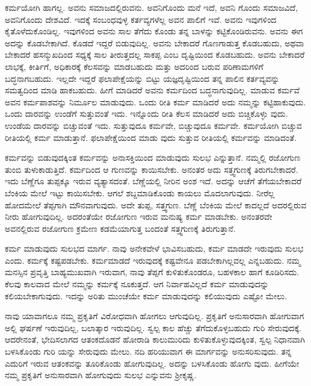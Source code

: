 ಕರ್ಮಯೋಗಿ ಹಾಗಲ್ಲ. ಅವನು ಸಮಾಜದಲ್ಲಿರುವನು. ಅವನಿಗೊಂದು ಮನೆ ಇದೆ, ಅವನಿ ಗೊಂದು ಸಮಾಜವಿದೆ, ಅವನಿಗೊಂದು ದೇಶವಿದೆ. ಇದಕ್ಕೆ ಸಂಬಂಧವುಳ್ಳ ಕರ್ತವ್ಯಗಳೆಲ್ಲ ಅವನ ಪಾಲಿಗೆ ಇವೆ. ಅವನು ಇವುಗಳಿಂದ ಕೈತೊಳೆದುಕೊಂಡಿಲ್ಲ. ಇವುಗಳಿಂದ ಅವನು ಸಾಲ ತೆಗೆದು ಕೊಂಡು ತನ್ನ ಬಾಳನ್ನು ಕಟ್ಟಿಕೊಂಡಿರುವನು. ಅವನು ಈಗ ಅದನ್ನು ಕೊಡಬೇಕಾಗಿದೆ. ಕೊಡದೆ ಇದ್ದರೆ ಬಿಡುವುದಿಲ್ಲ. ಅವನು ಬೇಕಾದರೆ ಗೊಣಗಾಡುತ್ತ ಕೊಡಬಹುದು, ಅಥವಾ ಬೇಕಾದರೆ ಹಸನ್ಮುಖದಿಂದ ಸಧ್ಯಕ್ಕೆ ಸಾಲ ತೀರುತ್ತದಲ್ಲ ಸಾಕಪ್ಪ ಎಂಬ ದೃಷ್ಟಿಯಿಂದ ಕೊಡಬಹುದು. ಅವನು ಬೇಕಾದರೆ ಲಾಭಕ್ಕೆ, ಕೀರ್ತಿಗೆ, ಅಧಿಕಾರಕ್ಕೆ ಕೆಲಸವನ್ನು ಮಾಡಬಹುದು ಮತ್ತು ಅದರಿಂದ ಬರುವ ಪರಿಣಾಮಗಳಿಗೆ ಬದ್ಧನಾಗಬಹುದು. ಇಲ್ಲದೇ ಇದ್ದರೆ ಫಲಾಪೇಕ್ಷೆಯನ್ನು ಬಿಟ್ಟು ಯಜ್ಞದೃಷ್ಟಿಯಿಂದ ತನ್ನ ಪಾಲಿನ ಕರ್ತವ್ಯವನ್ನು ಸಮತ್ವದಿಂದ ಮಾಡಿ ಹಾಕಬಹುದು. ಹೀಗೆ ಮಾಡಿದರೆ ಅವನು ಕರ್ಮದಿಂದ ಬದ್ಧನಾಗುವುದಿಲ್ಲ. ಮಾಡುವ ಕರ್ಮವೆ ಅವನ ಕರ್ಮಪಾಶವನ್ನು ನಿರ್ಮೂಲ ಮಾಡುವುದು. ಒಂದು ರೀತಿ ಕರ್ಮ ಮಾಡಿದರೆ ಅದು ನಮ್ಮನ್ನು ಕಟ್ಟಿಹಾಕುವುದು. ಒಂದು ದಾರವನ್ನು ಉಂಡೆಗೆ ಸುತ್ತುವಂತೆ ಇದು. ಇನ್ನೊಂದು ರೀತಿ ಕೆಲಸ ಮಾಡಿದರೆ ಅದು ಬಿಚ್ಚಿಕೊಳ್ಳು ವುದು. ಉಂಡೆಯ ದಾರವನ್ನು ಬಿಚ್ಚುವಂತೆ ಇದು. ಸುತ್ತುವುದೂ ಕರ್ಮವೇ, ಬಿಚ್ಚುವುದೂ ಕರ್ಮವೇ. ಕರ್ಮಯೋಗಿ ಬಿಚ್ಚುವ ರೀತಿಯಲ್ಲಿ ಕರ್ಮ ಮಾಡುತ್ತಾನೆ. ಫಲಾಪೇಕ್ಷೆಯಿಂದ ಮಾಡು ವುದು ಸುತ್ತುವ ರೀತಿಯಲ್ಲಿ ಕರ್ಮವನ್ನು ಮಾಡಿದಂತೆ.

ಕರ್ಮವನ್ನು ಬಿಡುವುದಕ್ಕಿಂತ ಕರ್ಮವನ್ನು ಅನಾಸಕ್ತಿಯಿಂದ ಮಾಡುವುದು ಸುಲಭ ಎನ್ನುತ್ತಾನೆ. ನಮ್ಮಲ್ಲಿ ರಜೋಗುಣ ತುಂಬಿ ತುಳುಕಾಡುತ್ತಿದೆ. ಕರ್ಮದಿಂದ ಆ ಗುಣವನ್ನು ಕಾಯಿಸಬೇಕು. ಅನಂತರ ಅದು ಸತ್ತ್ವಗುಣಕ್ಕೆ ತಿರುಗಬೇಕಾದರೆ. ಇದು ಬೆಣ್ಣೆಗೂ ತುಪ್ಪಕ್ಕೂ ಇರುವ ವ್ಯತ್ಯಾಸದಂತೆ. ಬೆಣ್ಣೆಯಲ್ಲಿ ನೀರಿನ ಅಂಶ ಇದೆ. ಅದನ್ನು ಆಚೆಗೆ ತೆಗೆಯಬೇಕಾದರೆ ಬೆಂಕಿಯ ಮೇಲೆ ಇಟ್ಟು ಕಾಯಿಸಬೇಕು. ಆಗಲೆ ಶಬ್ದಮಾಡಿಕೊಂಡು ಕಾಯಲು ಮೊದಲಾಗುವುದು. ನೀರೆಲ್ಲ ಹೋದಮೇಲೆ ತೆಪ್ಪಗಾಗಿ ಮೌನವಾಗುವುದು. ಅದೇ ತುಪ್ಪ, ಸತ್ತ್ವಗುಣ. ಬೆಣ್ಣೆ ಬೆಂಕಿಯ ಮೇಲೆ ಕಾದಲ್ಲದೆ ಅದರಲ್ಲಿರುವ ನೀರು ಹೋಗುವುದಿಲ್ಲ. ಅದರಂತೆಯೇ ರಜೋಗುಣ ಇರುವ ಮನುಷ್ಯ ಕರ್ಮ ಮಾಡಬೇಕು. ಅನಂತರವೇ ಅವನಲ್ಲಿರುವ ರಜೋಗುಣ ಕ್ರಮೇಣ ಕಡಮೆಯಾಗುತ್ತ ಬಂದಂತೆ ಸತ್ತ್ವಗುಣಕ್ಕೆ ತಿರುಗುತ್ತಾನೆ.

ಕರ್ಮ ಮಾಡುವುದು ಸುಲಭದ ಮಾರ್ಗ. ನಾವು ಅನೇಕವೇಳೆ ಭಾವಿಸಬಹುದು, ಕರ್ಮ ಮಾಡದೇ ಇರುವುದು ಸುಲಭ ಎಂದು. ಕರ್ಮಕ್ಕೆ ಕಷ್ಟಪಡಬೇಕು. ಕರ್ಮಮಾಡದೆ ಇರುವುದಕ್ಕೆ ಕಷ್ಟವೇನೂ ಪಡಬೇಕಾಗಿಲ್ಲವಲ್ಲ ಎನ್ನಬಹುದು. ನಮ್ಮ ಮನಸ್ಸಿನ ಪ್ರವೃತ್ತಿ ಬಾಹ್ಯಮುಖವಾಗಿ ಇರುವಾಗ, ನಾವು ತೆಪ್ಪಗೆ ಕುಳಿತುಕೊಂಡರೂ, ಬಹಳಕಾಲ ಹಾಗೆ ಕೂಡಿರಿಸದು. ಕೆಲವು ಕಾಲವಾದ ಮೇಲೆ ನಮ್ಮನ್ನು ಕರ್ಮಕ್ಕೆ ನೂಕುತ್ತದೆ. ಆಗ ನಿರ್ವಾಹವಿಲ್ಲದೆ ಕರ್ಮ ಮಾಡುವುದನ್ನು ಕಲಿಯಬೇಕಾಗುವುದು. ಇದನ್ನು ಅರಿತು ಮುಂಚೆಯೇ ಕರ್ಮ ಮಾಡುವುದನ್ನು ಕಲಿಯುವುದು ಎಷ್ಟೋ ಮೇಲು.

ನಾವು ಯಾವಾಗಲೂ ನಮ್ಮ ಪ್ರಕೃತಿಗೆ ವಿರೋಧವಾಗಿ ಹೋಗಲು ಆಗುವುದಿಲ್ಲ. ಪ್ರಕೃತಿಗೆ ಅನುಸಾರವಾಗಿ ಹೋಗುವಾಗ ಅಲ್ಲಿ ಘರ್ಷಣೆ ಇರುವುದಿಲ್ಲ, ಬಲಾತ್ಕಾರ ಇರುವುದಿಲ್ಲ. ಸ್ವಲ್ಪ ಕಾಲ ಹೆಚ್ಚು ತೆಗೆದುಕೊಳ್ಳಬಹುದು ಗುರಿ ಸೇರುವುದಕ್ಕೆ. ಆದರೇನಂತೆ, ಭೇದಿಸಲಾಗದ ಆತಂಕದೊಡನೆ ಹೋರಾಡಿ ಕಾಲುಮುರಿದು ಕುಳಿತುಕೊಳ್ಳುವುದಕ್ಕಿಂತ, ಸ್ವಲ್ಪ ನಿಧಾನವಾಗಿ ಬಳಸಿಕೊಂಡು ಗುರಿ ಯನ್ನು ಸೇರುವುದು ಮೇಲು. ನದಿ ಹರಿಯುವಾಗ ಈ ಮಾರ್ಗವನ್ನು ಅನುಸರಿಸುವುದು. ತನ್ನ ಎದುರಿಗೆ ಇರುವ ಆತಂಕವನ್ನು ತೂರಿಕೊಂಡು ಹೋಗುವುದಿಲ್ಲ. ಅದನ್ನು ಬಳಸಿಕೊಂಡು ಹೋಗು ವುದು. ಹೀಗೆಯೇ ನಮ್ಮ ಪ್ರಕೃತಿಗೆ ಅನುಸಾರವಾಗಿ ಹೋಗುವುದು ಸುಲಭ ಎನ್ನುವನು ಶ‍್ರೀಕೃಷ್ಣ.

